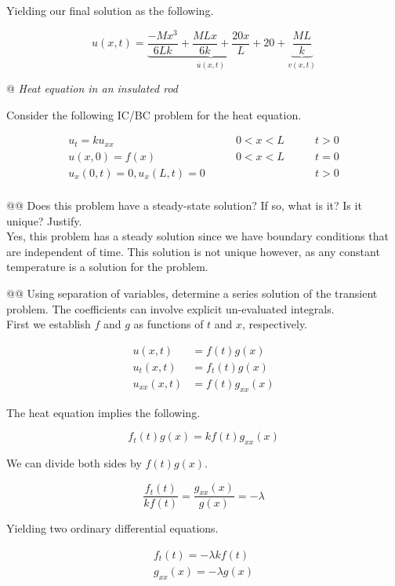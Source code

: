 \documentclass[10pt]{article}
\begin{document}
\begin{easylist}[enumerate]
    Yielding our final solution as the following.

    \[
        u(x, t) = \underbrace{\frac{-Mx^3}{6Lk} + \frac{MLx}{6k} + \frac{20x}{L} + 20}_{\overline{u}(x, t)} +
            \underbrace{\frac{ML}{k}}_{v(x, t)}
    \]

    \newpage
    @ \textit{Heat equation in an insulated rod}

    Consider the following IC/BC problem for the heat equation.

    \begin{align*}
        u_t = k u_{xx} \qquad &0 < x < L \qquad &t > 0\\
        u(x, 0) = f(x) \qquad &0 < x < L \qquad &t = 0\\
        u_x(0, t) = 0, u_x(L, t) = 0 \qquad &&t > 0\\
    \end{align*}

    @@ Does this problem have a steady-state solution? If so, what is it? Is it unique? Justify.\\

    Yes, this problem has a steady solution since we have boundary conditions that are independent of time. This
    solution is not unique however, as any constant temperature is a solution for the problem.

    @@ Using separation of variables, determine a series solution of the transient problem. The coefficients can involve
    explicit un-evaluated integrals.\\

    First we establish $f$ and $g$ as functions of $t$ and $x$, respectively.

    \begin{align*}
        u(x, t) &= f(t) g(x)\\
        u_t(x, t) &= f_t(t) g(x)\\
        u_{xx}(x, t) &= f(t) g_{xx}(x)
    \end{align*}

    The heat equation implies the following.

    \[
        f_t(t) g(x) = k f(t) g_{xx}(x)
    \]

    We can divide both sides by $f(t)g(x)$.

    \[
        \frac{f_t(t)}{kf(t)} = \frac{g_{xx}(x)}{g(x)} = -\lambda
    \]

    Yielding two ordinary differential equations.

    \begin{align*}
        f_t(t) = -\lambda k f(t)\\
        g_{xx}(x) = -\lambda g(x)
    \end{align*}


\end{easylist}
\end{document}
